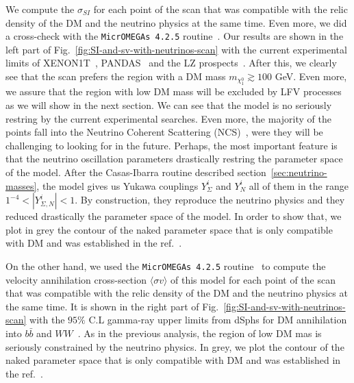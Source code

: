\documentclass[12pt,letterpaper]{article}
\begin{document}
We compute the $\sigma_{SI}$ for each point of the scan that was compatible with the relic density of the DM and the neutrino physics at the same time. Even more, we did a cross-check with the \texttt{MicrOMEGAs 4.2.5} routine~\cite{Belanger:2006is}. 
Our results are shown in the left part of Fig.~\ref{fig:SI-and-sv-with-neutrinos-scan} with the current experimental limits of XENON1T~\cite{Aprile:2018dbl}, PANDAS~\cite{Cui:2017nnn} and the LZ prospects~\cite{Mount:2017qzi}. 
After this, we clearly see that the scan prefers the region with a DM mass $m_{\chi^0_1}\gtrsim 100$ GeV. 
Even more, we assure that the region with low DM mass will be excluded by LFV processes as we will show in the next section.
We can see that the model is no seriously restring by the current experimental searches. Even more, the majority of the points fall into the Neutrino Coherent Scattering (NCS)~\cite{Cushman:2013zza, Billard:2013qya}, were they will be challenging to looking for in the future.
Perhaps, the most important feature is that the neutrino oscillation parameters drastically restring the parameter space of the model. 
After the Casas-Ibarra routine described section~\ref{sec:neutrino-masses}, the model gives us Yukawa couplings $Y_{\Sigma}^i$ and $Y_N^i$ all of them in the range $1^{-4}<|Y_{\Sigma, N}^i|<1$. By construction, they reproduce the neutrino physics and they reduced drastically the parameter space of the model. In order to show that, we plot in grey the contour of the naked parameter space that is only compatible with DM and was established in the ref.~\cite{Hirsch:2013ola}.   

On the other hand, we used the \texttt{MicrOMEGAs 4.2.5} routine~\cite{Belanger:2006is} to compute the velocity annihilation cross-section $\langle \sigma v\rangle$ of this model for each point of the scan that was compatible with the relic density of the DM and the neutrino physics at the same time. 
It is shown in the right part of Fig.~\ref{fig:SI-and-sv-with-neutrinos-scan} with the $95\%$ C.L gamma-ray upper limits from dSphs for DM annihilation into $b\bar{b}$ and $WW$~\cite{Ackermann:2015zua}.
As in the previous analysis, the region of low DM mas is seriously constrained by the neutrino physics. In grey, we plot the contour of the naked parameter space that is only compatible with DM and was established in the ref.~\cite{Hirsch:2013ola}.
\end{document}

